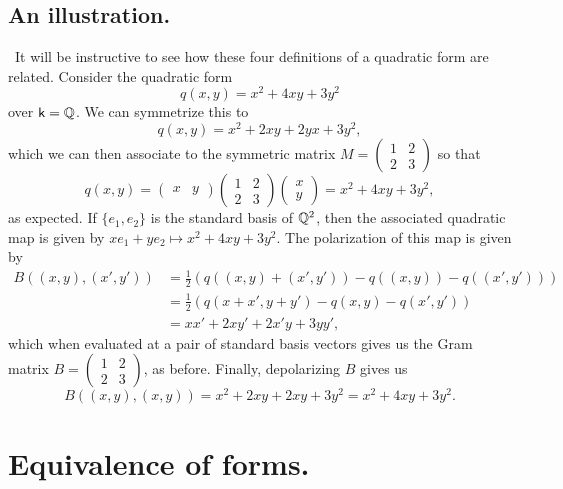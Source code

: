 \subsection{An illustration.}~It will be instructive to see how these four definitions of a quadratic form are related. Consider the quadratic form \[q(x, y) = x^2 + 4xy + 3y^2\] over \(\mathsf{k} = \mathbb{Q}\). We can symmetrize this to \[q(x, y) = x^2 + 2xy + 2yx + 3y^2,\] which we can then associate to the symmetric matrix \(M = \begin{pmatrix} 1 & 2 \\ 2 & 3 \end{pmatrix}\) so that
\[
  q(x, y) = \begin{pmatrix}
    x & y
  \end{pmatrix} \begin{pmatrix}
    1 & 2 \\
    2 & 3
  \end{pmatrix} \begin{pmatrix}
    x \\ y
  \end{pmatrix}= x^2 + 4xy + 3y^2,
\]
as expected. If \(\{e_1, e_2\}\) is the standard basis of \(\mathbb{Q}^2\), then the associated quadratic map is given by \(xe_1 + ye_2 \mapsto x^2 + 4xy + 3y^2\). The polarization of this map is given by
\begin{align*}
  B((x,y), (x', y')) &= \frac{1}{2}\left(q((x,y) + (x', y')) - q((x,y)) - q((x', y'))\right)\\
  &= \frac{1}{2}\left(q(x+x', y+y') - q(x, y) - q(x', y')\right)\\
  &= xx' + 2xy' + 2x'y + 3yy',
\end{align*}
which when evaluated at a pair of standard basis vectors gives us the Gram matrix \(B = \begin{pmatrix} 1 & 2 \\ 2 & 3 \end{pmatrix}\), as before. Finally, depolarizing \(B\) gives us
\[
  B((x, y), (x, y)) = x^2 + 2xy + 2xy + 3y^2 = x^2 + 4xy + 3y^2.
\]

\section{Equivalence of forms.}

